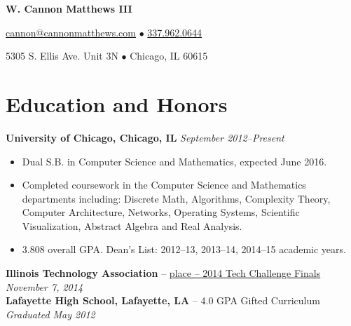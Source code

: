 \documentclass[10pt,letterpaper]{article} %
\begin{document}
 
    \centerline{\LARGE \bf W. Cannon Matthews III} 
    \centerline{ \href{mailto:cannon@cannonmatthews.com}{cannon@cannonmatthews.com} $\bullet$ \href{tel:13379620644}{337.962.0644 }}
    \centerline{5305 S. Ellis Ave. Unit 3N $\bullet$ Chicago, IL 60615 }
    \hrulefill
%
    \section*{Education and Honors}
        \textbf{University of Chicago, Chicago, IL} \hfill \textit{ September 2012--Present } 
        \begin{itemize} 
            \item Dual S.B. in Computer Science and Mathematics, expected June 2016. 
            \item Completed coursework in the Computer Science and Mathematics departments including: Discrete Math, Algorithms, Complexity Theory, Computer Architecture, Networks, Operating Systems, Scientific Visualization, Abstract Algebra and Real Analysis.  
            \item 3.808 overall GPA. Dean's List: 2012--13, 2013--14, 2014--15 academic years. 
        \end{itemize}
        \textbf{Illinois Technology Association} -- \href{http://www.chicagotribune.com/bluesky/originals/chi-university-of-chicago-student-wins-tech-challenge-bsi-story.html}{ place -- 2014 Tech Challenge Finals} \hfill \textit{November 7, 2014} 
        \vspace{0.5em}\\
        \textbf{Lafayette High School, Lafayette, LA} -- 4.0 GPA Gifted Curriculum \hfill \textit{Graduated May 2012 } 
\end{document}

